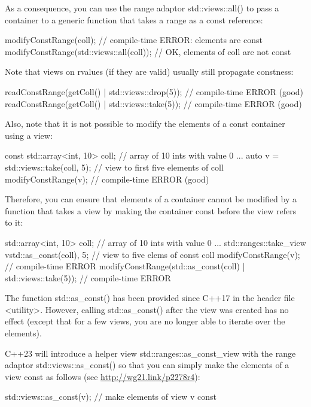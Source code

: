 As a consequence, you can use the range adaptor std::views::all() to pass a container to a generic function that takes a range as a const reference:

\begin{cpp}
modifyConstRange(coll); // compile-time ERROR: elements are const
modifyConstRange(std::views::all(coll)); // OK, elements of coll are not const
\end{cpp}

Note that views on rvalues (if they are valid) usually still propagate constness:

\begin{cpp}
readConstRange(getColl() | std::views::drop(5)); // compile-time ERROR (good)
readConstRange(getColl() | std::views::take(5)); // compile-time ERROR (good)
\end{cpp}

Also, note that it is not possible to modify the elements of a const container using a view:

\begin{cpp}
const std::array<int, 10> coll{}; // array of 10 ints with value 0
...
auto v = std::views::take(coll, 5); // view to first five elements of coll
modifyConstRange(v); // compile-time ERROR (good)
\end{cpp}

Therefore, you can ensure that elements of a container cannot be modified by a function that takes a view by making the container const before the view refers to it:

\begin{cpp}
std::array<int, 10> coll{}; // array of 10 ints with value 0
...
std::ranges::take_view v{std::as_const(coll), 5}; // view to five elems of const coll
modifyConstRange(v); // compile-time ERROR
modifyConstRange(std::as_const(coll) | std::views::take(5)); // compile-time ERROR
\end{cpp}

The function std::as\_const() has been provided since C++17 in the header file <utility>. However, calling std::as\_const() after the view was created has no effect (except that for a few views, you are no longer able to iterate over the elements).

C++23 will introduce a helper view std::ranges::as\_const\_view with the range adaptor std::views::as\_const() so that you can simply make the elements of a view const as follows (see \url{http://wg21.link/p2278r4}):

\begin{cpp}
std::views::as_const(v); // make elements of view v const
\end{cpp}

